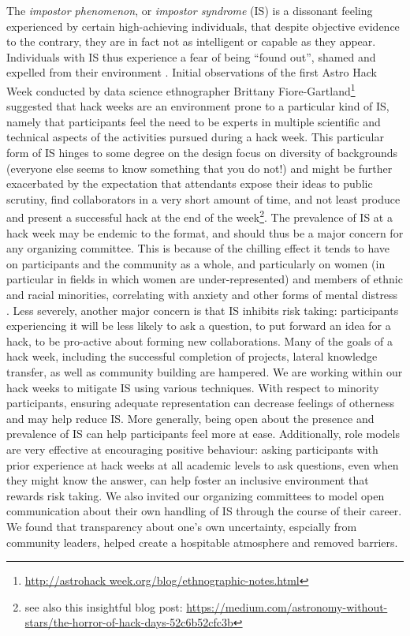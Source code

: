 \documentclass{aastex62}
\begin{document}
The \textit{impostor phenomenon}, or \textit{impostor syndrome} (IS) is a dissonant feeling experienced by certain high-achieving individuals, that despite objective evidence to the contrary, they are in fact not as intelligent or capable as they appear.
Individuals with IS thus experience a fear of being ``found out'', shamed and expelled from their environment \cite{Clance1978-ef}.
Initial observations of the first Astro Hack Week conducted by data science ethnographer Brittany Fiore-Gartland\footnote{\url{http://astrohack week.org/blog/ethnographic-notes.html}} suggested that hack weeks are an environment prone to a particular kind of IS, namely that participants feel the need to be experts in multiple scientific and technical aspects of the activities pursued during a hack week.
This particular form of IS hinges to some degree on the design focus on diversity of backgrounds (everyone else seems to know something that you do not!) and might be further exacerbated by the expectation that attendants expose their ideas to public scrutiny, find collaborators in a very short amount of time, and not least produce and present a successful hack at the end of the week\footnote{see also this insightful blog post: \url{https://medium.com/astronomy-without-stars/the-horror-of-hack-days-52c6b52cfc3b}}.
The prevalence of IS at a hack week may be endemic to the format, and should thus be a major concern for any organizing committee.
This is because of the chilling effect it tends to have on participants and the community as a whole, and particularly on women (in particular in fields in which women are under-represented) and members of ethnic and racial minorities, correlating with anxiety and other forms of mental distress \cite{Parkman2016-ro}.
Less severely, another major concern is that IS inhibits risk taking: participants experiencing it will be less likely to ask a question, to put forward an idea for a hack, to be pro-active about forming new collaborations.
 Many of the goals of a hack week, including the successful completion of projects, lateral knowledge transfer, as well as community building are hampered.
We are working within our hack weeks to mitigate IS using various techniques.
With respect to minority participants, ensuring adequate representation can decrease feelings of otherness and may help reduce IS.
More generally, being open about the presence and prevalence of IS can help participants feel more at ease. %
Additionally, role models are very effective at encouraging positive behaviour: asking participants with prior experience at hack weeks at all academic levels to ask questions, even when they might know the answer, can help foster an inclusive environment that rewards risk taking. We also invited our organizing committees to model open communication about their own handling of IS through the course of their career. We found that transparency about one's own uncertainty, espcially from community leaders, helped create a hospitable atmosphere and removed barriers. 
\end{document}
